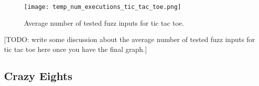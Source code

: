 \begin{figure}[h]
    \centering
    \texttt{[image: temp\_num\_executions\_tic\_tac\_toe.png]}
    \caption{Average number of tested fuzz inputs for tic tac toe.}
    \label{totalTimesTicTacToe}
\end{figure}

[TODO: write some discussion about the average number of tested fuzz inputs for tic tac toe here once you have the final graph.]


\subsection{Crazy Eights}
